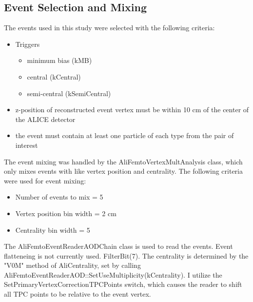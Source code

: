 \documentclass[../AnalysisNoteJBuxton.tex]{subfiles}
\begin{document}
\subsection{Event Selection and Mixing}
\label{EventSelection}

The events used in this study were selected with the following criteria:

\begin{itemize}
 \item Triggers
 \begin{itemize}
  \item minimum bias (kMB)
  \item central (kCentral)
  \item semi-central (kSemiCentral)
 \end{itemize}
 \item z-position of reconstructed event vertex must be within 10 cm of the center of the ALICE detector
 \item the event must contain at least one particle of each type from the pair of interest
\end{itemize}

The event mixing was handled by the AliFemtoVertexMultAnalysis class, which only mixes events with like vertex position and centrality.
The following criteria were used for event mixing:

\begin{itemize}
 \item Number of events to mix = 5
 \item Vertex position bin width = 2 cm
 \item Centrality bin width = 5%
\end{itemize}

The AliFemtoEventReaderAODChain class is used to read the events.
Event flatteneing is not currently used.
FilterBit(7).
The centrality is determined by the "V0M" method of AliCentrality, set by calling AliFemtoEventReaderAOD::SetUseMultiplicity(kCentrality).
I utilize the SetPrimaryVertexCorrectionTPCPoints switch, which causes the reader to shift all TPC points to be relative to the event vertex.
\end{document}
